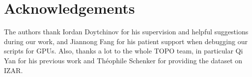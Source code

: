 \documentclass[10pt,conference,compsocconf]{IEEEtran}
\begin{document}




\section*{Acknowledgements}
The authors thank Iordan Doytchinov for his supervision and helpful suggestions during our work, and Jiannong Fang for his patient support when debugging our scripts for GPUs. Also, thanks a lot to the whole TOPO team, in particular Qi Yan for his previous work and Théophile Schenker for providing the dataset on IZAR.



\nocite{silva2020venv}
\nocite{brachmann2018dsac}
\nocite{rezzonico2020fs}
\nocite{rezzonico2020faq}
\nocite{varini2020tensorflow}





\end{document}
